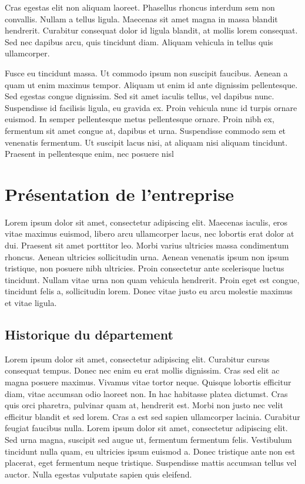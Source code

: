 \documentclass[a4paper,12pt]{report}
\begin{document}
Cras egestas elit non aliquam laoreet. Phasellus rhoncus interdum sem non convallis. Nullam a tellus ligula. Maecenas sit amet magna in massa blandit hendrerit. Curabitur consequat dolor id ligula blandit, at mollis lorem consequat. Sed nec dapibus arcu, quis tincidunt diam. Aliquam vehicula in tellus quis ullamcorper.

Fusce eu tincidunt massa. Ut commodo ipsum non suscipit faucibus. Aenean a quam ut enim maximus tempor. Aliquam ut enim id ante dignissim pellentesque. Sed egestas congue dignissim. Sed sit amet iaculis tellus, vel dapibus nunc. Suspendisse id facilisis ligula, eu gravida ex. Proin vehicula nunc id turpis ornare euismod. In semper pellentesque metus pellentesque ornare. Proin nibh ex, fermentum sit amet congue at, dapibus et urna. Suspendisse commodo sem et venenatis fermentum. Ut suscipit lacus nisi, at aliquam nisi aliquam tincidunt. Praesent in pellentesque enim, nec posuere nisl


\chapter{Présentation de l'entreprise}  %
Lorem ipsum dolor sit amet, consectetur adipiscing elit. Maecenas iaculis, eros vitae maximus euismod, libero arcu ullamcorper lacus, nec lobortis erat dolor at dui. Praesent sit amet porttitor leo. Morbi varius ultricies massa condimentum rhoncus. Aenean ultricies sollicitudin urna. Aenean venenatis ipsum non ipsum tristique, non posuere nibh ultricies. Proin consectetur ante scelerisque luctus tincidunt. Nullam vitae urna non quam vehicula hendrerit. Proin eget est congue, tincidunt felis a, sollicitudin lorem. Donec vitae justo eu arcu molestie maximus et vitae ligula.

\section{Historique du département}  %
Lorem ipsum dolor sit amet, consectetur adipiscing elit. Curabitur cursus consequat tempus. Donec nec enim eu erat mollis dignissim. Cras sed elit ac magna posuere maximus. Vivamus vitae tortor neque. Quisque lobortis efficitur diam, vitae accumsan odio laoreet non. In hac habitasse platea dictumst. Cras quis orci pharetra, pulvinar quam at, hendrerit est. Morbi non justo nec velit efficitur blandit et sed lorem. Cras a est sed sapien ullamcorper lacinia. Curabitur feugiat faucibus nulla. Lorem ipsum dolor sit amet, consectetur adipiscing elit. Sed urna magna, suscipit sed augue ut, fermentum fermentum felis. Vestibulum tincidunt nulla quam, eu ultricies ipsum euismod a. Donec tristique ante non est placerat, eget fermentum neque tristique. Suspendisse mattis accumsan tellus vel auctor. Nulla egestas vulputate sapien quis eleifend.
\end{document}
